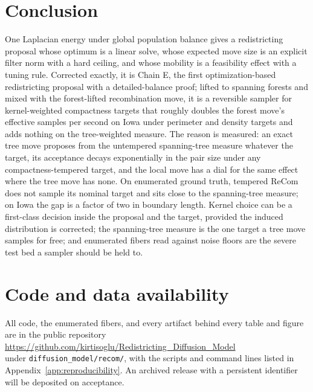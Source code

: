 \documentclass[11pt]{article}
\begin{document}
\section{Conclusion}\label{sec:conclusion}

One Laplacian energy under global population balance gives a
redistricting proposal whose optimum is a linear solve, whose expected
move size is an explicit filter norm with a hard ceiling, and whose
mobility is a feasibility effect with a tuning rule. Corrected
exactly, it is Chain E, the first optimization-based redistricting
proposal with a detailed-balance proof; lifted to spanning forests and
mixed with the forest-lifted recombination move, it is a reversible
sampler for kernel-weighted compactness targets that roughly doubles
the forest move's effective samples per second on Iowa under perimeter
and density targets and adds nothing on the tree-weighted measure.
The reason is measured: an exact tree move proposes from the
untempered spanning-tree measure whatever the target, its acceptance
decays exponentially in the pair size under any compactness-tempered
target, and the local move has a dial for the same effect where the
tree move has none. On enumerated ground truth, tempered ReCom does
not sample its nominal target and sits close to the spanning-tree
measure; on Iowa the gap is a factor of two in boundary length. Kernel
choice can be a first-class decision inside the proposal and the
target, provided the induced distribution is corrected; the
spanning-tree measure is the one target a tree move samples for free;
and enumerated fibers read against noise floors are the severe test
bed a sampler should be held to.

\section*{Code and data availability}

All code, the enumerated fibers, and every artifact behind every table
and figure are in the public repository\\
\url{https://github.com/kirtisoglu/Redistricting_Diffusion_Model}\\
under \texttt{diffusion\_model/recom/}, with the scripts and command
lines listed in Appendix~\ref{app:reproducibility}. An archived
release with a persistent identifier will be deposited on acceptance.
\end{document}
